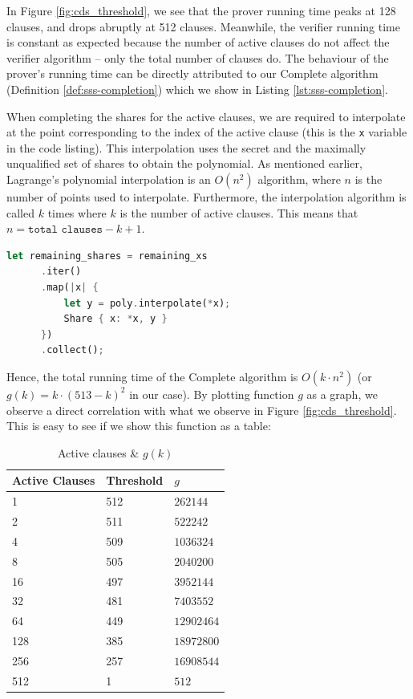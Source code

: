 In Figure \ref{fig:cds_threshold}, we see that the
prover running time peaks at 128 clauses, and drops abruptly at 512 clauses. Meanwhile, 
the verifier running time is constant as expected because the number of active 
clauses do not affect the verifier algorithm -- only the total number of clauses do.
The behaviour of the prover's running time can be directly attributed to 
our \textsf{Complete} algorithm (Definition \ref{def:sss-completion})
which we show in Listing \ref{lst:sss-completion}.

When completing the shares for the active clauses, we are required to interpolate 
at the point corresponding to the index of the active clause (this is the \texttt{x}
variable in the code listing). This interpolation 
uses the secret and the maximally unqualified set of shares to obtain the 
polynomial. As mentioned earlier, Lagrange's polynomial interpolation is an 
$O(n^2)$ algorithm, where $n$ is the number of points used to interpolate. 
Furthermore, the interpolation algorithm is called $k$ times where $k$ is the number of active 
clauses. This means that $n = \texttt{total clauses} - k + 1$. 

\begin{lstlisting}[language=rust, caption={Share Completion Algorithm},label={lst:sss-completion}]
  let remaining_shares = remaining_xs
      .iter()
      .map(|x| {
          let y = poly.interpolate(*x);
          Share { x: *x, y }
      })
      .collect();
\end{lstlisting}

Hence, the total running time of the \textsf{Complete} algorithm is $O(k \cdot n^2)$ (or
$g(k) = k \cdot (513 - k)^2$ in our case). By plotting function $g$ as a graph, we observe a 
direct correlation with what we observe in Figure \ref{fig:cds_threshold}. This is 
easy to see if we show this function as a table:

\begin{table}[H]
  \centering\caption{Active clauses \& $g(k)$}
  \vspace{0.5em}
  \begin{tabular}{lll}
    \toprule
    \textbf{Active Clauses} & \textbf{Threshold} & \textbf{$g$} \\
    \midrule
    1  & 512  & $262144$  \\
    2  & 511  & $522242$  \\
    4  & 509  & $1036324$  \\
    8  & 505  & $2040200$  \\
    16 & 497  & $3952144$ \\
    32 & 481  & $7403552$ \\
    64 & 449  & $12902464$ \\
    128 & 385 & $18972800$\\
    256 & 257 & $16908544$ \\
    512 & 1   & $512$ \\
    \bottomrule
  \end{tabular}
\end{table}

